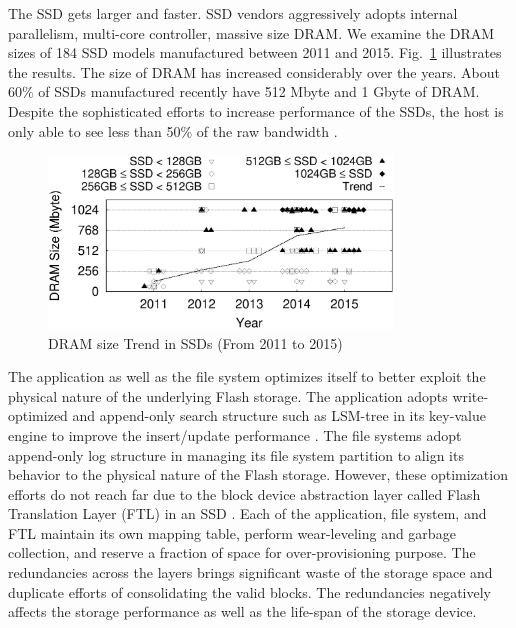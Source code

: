 \documentclass[pageno]{jpaper}
\begin{document}
The SSD gets larger and faster. SSD vendors aggressively adopts
internal parallelism, multi-core controller, massive size DRAM.  We
examine the DRAM sizes of 184 SSD models manufactured between 2011 and
2015.
Fig.~\ref{fig:dram_size} illustrates the results.
The size of DRAM has increased considerably over the years. About
60$\%$ of SSDs manufactured recently have 512 Mbyte and 1
Gbyte of DRAM. Despite the sophisticated efforts to increase performance of the SSDs, 
the host is only able to see less than 50\% of the raw bandwidth \cite{sdf}.

\begin{figure}[t]
\begin{center}
\includegraphics[width=3.6in]{./figure/dram_size.eps}
\caption{DRAM size Trend in SSDs (From 2011 to 2015)}
\label{fig:dram_size}
\end{center}
\end{figure}

The application as well as the file system optimizes itself to better
exploit the physical nature of the underlying Flash storage. The
application adopts write-optimized and append-only search structure
such as LSM-tree \cite{o1996log} in its key-value engine to improve the
insert/update performance \cite{chang2008bigtable, cassandraDB,
  mongodb, rocksdb}. The file systems adopt append-only log structure
in managing its file system partition \cite{lee2015f2fs,nilfs2006} to align its behavior to the
physical nature of the Flash storage. However, these optimization
efforts do not reach far due to the block device abstraction layer
called Flash Translation Layer (FTL) in an SSD  \cite{last08, dftl09,
  kang2006superblock}.  Each of the application, file system, and FTL
maintain its own mapping table, perform wear-leveling and garbage
collection, and reserve a fraction of space for over-provisioning
purpose. The redundancies across the layers brings significant waste of
the storage space and duplicate efforts of consolidating the valid
blocks. The redundancies negatively affects the storage performance as
well as the life-span of the storage device.
\end{document}
